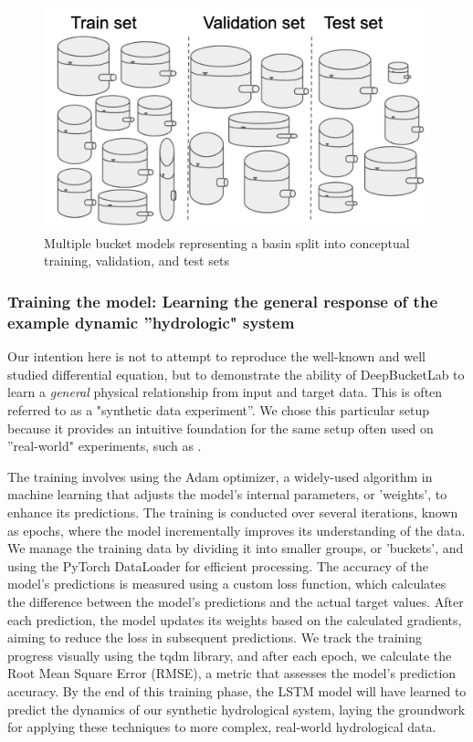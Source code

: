 \documentclass{article}
\begin{document}
\begin{figure}[h]
\centering
\includegraphics[width=\textwidth]{figures/bucket_splits.png}
\caption{Multiple bucket models representing a basin split into conceptual training, validation, and test sets}
\label{fig:splits}
\end{figure}

\subsubsection{Training the model: Learning the general response of the example dynamic ''hydrologic" system}
\label{methods:training}

Our intention here is not to attempt to reproduce the well-known and well studied differential equation, but to demonstrate the ability of DeepBucketLab to learn a \emph{general} physical relationship from input and target data. This is often referred to as a "synthetic data experiment''. We chose this particular setup because it provides an intuitive foundation for the same setup often used on ''real-world" experiments, such as \citet{kratzert2019toward, frame2021post, frame2022extreme, frame2023massbalance}.

The training involves using the Adam optimizer, a widely-used algorithm in machine learning that adjusts the model's internal parameters, or 'weights', to enhance its predictions. The training is conducted over several iterations, known as epochs, where the model incrementally improves its understanding of the data. We manage the training data by dividing it into smaller groups, or 'buckets', and using the PyTorch DataLoader for efficient processing. The accuracy of the model's predictions is measured using a custom loss function, which calculates the difference between the model's predictions and the actual target values. After each prediction, the model updates its weights based on the calculated gradients, aiming to reduce the loss in subsequent predictions. We track the training progress visually using the tqdm library, and after each epoch, we calculate the Root Mean Square Error (RMSE), a metric that assesses the model's prediction accuracy. By the end of this training phase, the LSTM model will have learned to predict the dynamics of our synthetic hydrological system, laying the groundwork for applying these techniques to more complex, real-world hydrological data.
\end{document}
